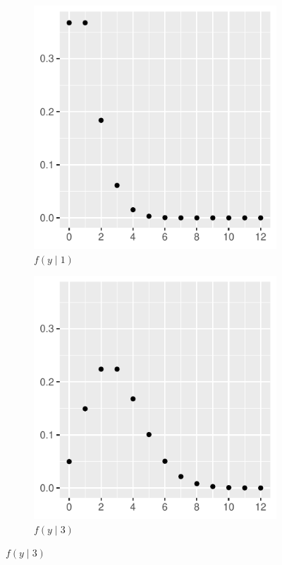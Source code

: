 \documentclass[11pt,letterpaper]{article}
\begin{document}
\begin{figure}[htbp]
  \caption{Probability mass function of Poisson distributions}
  \label{fig:pois_pmf}
  \begin{subfigure}{.33\textwidth}
    \centering
    \caption*{$f(y \mid 1)$}
    \includegraphics[width=\linewidth]{pois_1_pmf.pdf}
  \end{subfigure}%
  \begin{subfigure}{.33\textwidth}
    \centering
    \caption*{$f(y \mid 3)$}
    \includegraphics[width=\linewidth]{pois_3_pmf.pdf}

\end{subfigure}
\end{figure}
\end{document}
